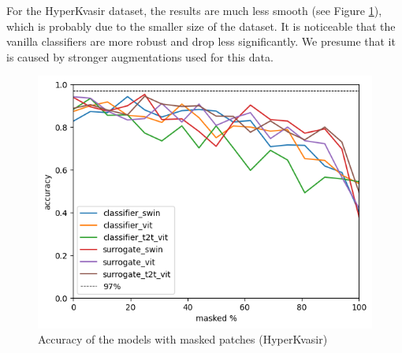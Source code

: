 \documentclass[magisterska,en]{pracamgr}
\begin{document}
For the HyperKvasir dataset, the results are much less smooth (see Figure \ref{gastro_masked_accuracy}), which is probably due to the smaller size of the dataset. It is noticeable that the vanilla classifiers are more robust and drop less significantly. We presume that it is caused by stronger augmentations used for this data.



\begin{figure}[H]
\centering
\includegraphics[scale=0.8]{./images/gastro_masked_accuracy.png}
\caption{Accuracy of the models with masked patches (HyperKvasir)}
\label{gastro_masked_accuracy}
\end{figure}
\end{document}
